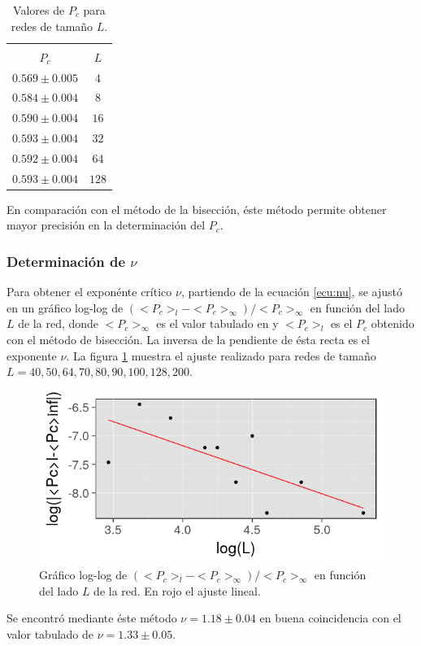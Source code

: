 \documentclass[%
 reprint,
 amsmath,amssymb,
 aps,
spanish]{revtex4-1}
\begin{document}
\begin{table}[h]
\caption{\label{tabla:tabla1b}Valores de $P_c$ para redes de tamaño $L$.}
	\begin{tabular}{c|c}
		\hline
		\hline		
		\\[-5pt]
		$P_c$ & $L$ \\
		\hline
		$0.569\pm0.005$ & $4$ \\
		$0.584\pm0.004$ & $8$ \\
		$0.590\pm0.004$ & $16$ \\
		$0.593\pm0.004$ & $32$ \\
		$0.592\pm0.004$ & $64$ \\
		$0.593\pm0.004$ & $128$ \\															
	\end{tabular}
\end{table}

En comparación con el método de la bisección, éste método permite obtener mayor precisión en la determinación del $P_c$.

\subsubsection{Determinación de $\nu$}
Para obtener el exponénte crítico $\nu$, partiendo de la ecuación \ref{ecu:nu}, se ajustó en un gráfico log-log de $(<P_c>_l - <P_c>_{\infty})/<P_c>_{\infty}$ en función del lado $L$ de la red, donde $<P_c>_{\infty}$ es el valor tabulado en \cite{stauffer} y $<P_c>_l$ es el $P_c$ obtenido con el método de bisección. La inversa de la pendiente de ésta recta es el exponente $\nu$. La figura \ref{fig:nu} muestra el ajuste realizado para redes de tamaño $L={40, 50, 64, 70, 80, 90, 100, 128, 200}$.
\begin{figure}[h!]
  \centering
  \includegraphics[width=.95\linewidth]{ej1c/nu}
\caption{Gráfico log-log de $(<P_c>_l - <P_c>_{\infty})/<P_c>_{\infty}$ en función del lado $L$ de la red. En rojo el ajuste lineal.}
\label{fig:nu}
\end{figure}
Se encontró mediante éste método $\nu=1.18\pm0.04$ en buena coincidencia con el valor tabulado de $\nu=1.33\pm0.05$.
\end{document}
